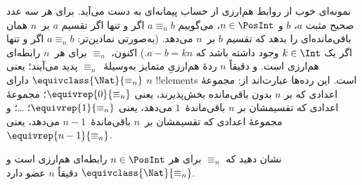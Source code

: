 \documentclass[../../../include/open-logic-section]{subfiles}
\begin{document}
\begin{ex}
نمونه‌ای خوب از روابط هم‌ارزی از حساب پیمانه‌ای به دست می‌آید. برای هر
سه عدد صحیح مثبت $a$، $b$ و $n \in \PosInt$، می‌گوییم $a \equiv_n b$ اگر و تنها اگر
تقسیم $a$ بر~$n$ همان باقی‌مانده‌ای را بدهد که تقسیم $b$ بر~$n$ می‌دهد.
(به‌صورتی نمادین‌تر: $a \equiv_n b$ اگر و تنها اگر یک $k \in
\Int$ وجود داشته باشد که $a - b = kn$.) اکنون، $\equiv_n$ برای
هر~$n$ رابطه‌ای هم‌ارزی است. و دقیقاً $n$ ردهٔ هم‌ارزیِ متمایز
به‌وسیلهٔ~$\equiv_n$ پدید می‌آیند؛ یعنی $\equivclass{\Nat}{\equiv_n}$
دارای $n$ !!{element}s است. این رده‌ها عبارت‌اند از: مجموعهٔ اعدادی که
بر $n$ بدون باقی‌مانده بخش‌پذیرند، یعنی $\equivrep{0}{\equiv_n}$؛
مجموعهٔ اعدادی که تقسیمشان بر $n$ باقی‌ماندهٔ~$1$ می‌دهد، یعنی
$\equivrep{1}{\equiv_n}$؛ \ldots؛ و مجموعهٔ اعدادی که تقسیمشان بر~$n$
باقی‌ماندهٔ~$n-1$ می‌دهد، یعنی~$\equivrep{n-1}{\equiv_n}$.
\end{ex}

\begin{prob}
نشان دهید که $\equiv_n$ برای هر $n \in
\PosInt$ رابطه‌ای هم‌ارزی است و
$\equivclass{\Nat}{\equiv_n}$ دقیقاً $n$ عضو دارد.
\end{prob}
\end{document}
